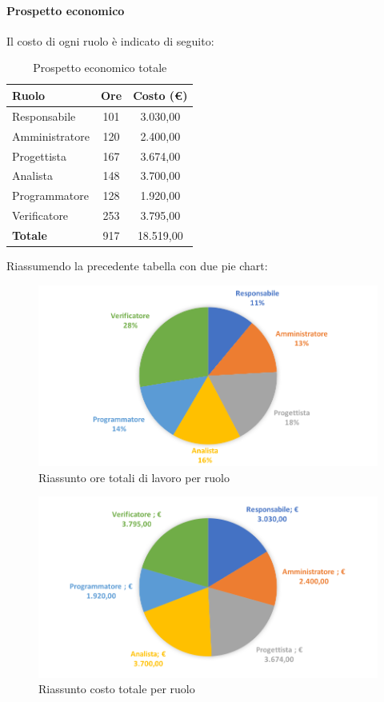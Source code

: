 \documentclass[../PianoDiProgetto.tex]{subfiles}
\begin{document}
			\newpage
			\paragraph{Prospetto economico}
			Il costo di ogni ruolo è indicato di seguito:
			\begin{table}[h]
				\centering
				\begin{tabular}{l * {2}{c}}
				\toprule
				\textbf{Ruolo} & \textbf{Ore} & \textbf{Costo (\euro{})} \\
				\midrule
				Responsabile & 101 & 3.030,00 \\
				Amministratore & 120 & 2.400,00 \\
				Progettista & 167 & 3.674,00 \\
				Analista & 148 & 3.700,00 \\		
				Programmatore & 128 & 1.920,00 \\		
				Verificatore & 253 & 3.795,00 \\				
				\midrule		
				\textbf{Totale} & 917 & 18.519,00 \\
				\bottomrule	
				\end{tabular}
				\caption{Prospetto economico totale}		
			\end{table}
			
			Riassumendo la precedente tabella con due pie chart:	
			\begin{figure}[!h]
				\centering
				\includegraphics[width=\textwidth]{Preventivo/Immagini/totale_oreRuolo.png}
				\caption{Riassunto ore totali di lavoro per ruolo}
			\end{figure}	
			\newpage
			\begin{figure}[!h]
				\centering
				\includegraphics[width=\textwidth]{Preventivo/Immagini/totale_costoRuolo.png}
				\caption{Riassunto costo totale per ruolo}
			\end{figure}	
\end{document}
